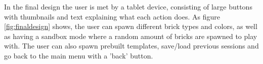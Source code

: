 In the final design the user is met by a tablet device, consisting of large buttons with thumbnails and text explaining what each action does. As figure \ref{fig:finaldesign} shows, the user can spawn different brick types and colors, as well as having a sandbox mode where a random amount of bricks are spawned to play with. The user can also spawn prebuilt templates, save/load previous sessions and go back to the main menu with a 'back' button. 

